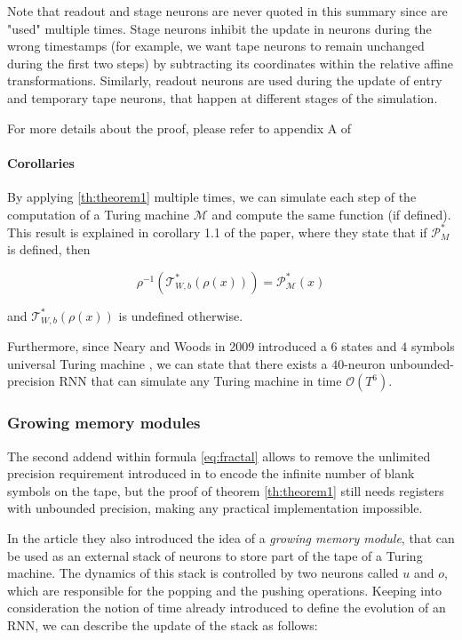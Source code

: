 \documentclass{article}
\begin{document}
Note that readout and stage neurons are never quoted in this summary since are "used" multiple times. Stage neurons inhibit the update in neurons during the wrong timestamps (for example, we want tape neurons to remain unchanged during the first two steps) by subtracting its coordinates within the relative affine transformations. Similarly, readout neurons are used during the update of entry and temporary tape neurons, that happen at different stages of the simulation.

For more details about the proof, please refer to appendix A of \cite{CHU21}

\paragraph{Corollaries}
By applying \ref{th:theorem1} multiple times, we can simulate each step of the computation of a Turing machine $\mathcal{M}$ and compute the same function (if defined). This result is explained in corollary 1.1 of the paper, where they state that if $\mathcal{P}^*_{M}$ is defined, then

$$\rho^{-1}(\mathcal{T}^*_{W,b}(\rho(x))) = \mathcal{P}^*_{\mathcal{M}}(x)$$

and $\mathcal{T}^*_{W,b}(\rho(x))$ is undefined otherwise.

Furthermore, since Neary and Woods in 2009 introduced a $6$ states and $4$ symbols universal Turing machine \cite{NEA09}, we can state that there exists a $40$-neuron unbounded-precision RNN that can simulate any Turing machine in time $\mathcal{O}(T^6)$.

\subsubsection{Growing memory modules}\label{sec:growingmodules}
The second addend within formula \ref{eq:fractal} allows to remove the unlimited precision requirement introduced in \cite{SIE95} to encode the infinite number of blank symbols on the tape, but the proof of theorem \ref{th:theorem1} still needs registers with unbounded precision, making any practical implementation impossible.

In the article they also introduced the idea of a \textit{growing memory module}, that can be used as an external stack of neurons to store part of the tape of a Turing machine. The dynamics of this stack is controlled by two neurons called $u$ and $o$, which are responsible for the popping and the pushing operations. Keeping into consideration the notion of time already introduced to define the evolution of an RNN, we can describe the update of the stack as follows:
\end{document}
